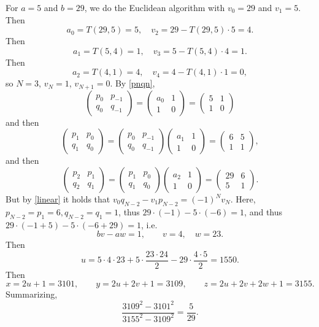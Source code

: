 \documentclass{article}
\begin{document}
 For $a=5$ and $b=29$, we do the Euclidean algorithm with
$v_0=29$ and $v_1=5$. 
Then 
\[
a_0 = T(29,5) = 5,\quad v_2 = 29 - T(29,5)\cdot 5 = 4.
\]
Then 
\[
a_1 = T(5,4) = 1,\quad v_3 = 5 - T(5,4)\cdot 4 = 1.
\]
Then
\[
a_2 = T(4,1) = 4,\quad v_4 = 4 - T(4,1) \cdot 1 = 0,
\]
so $N=3$, $v_N=1$, $v_{N+1}=0$.
By \eqref{pnqn},
\[
\begin{pmatrix}p_0&p_{-1}\\
q_0&q_{-1}
\end{pmatrix}
=\begin{pmatrix}a_0&1\\
1&0
\end{pmatrix}
=\begin{pmatrix}5&1\\
1&0
\end{pmatrix}
\]
and then
\[
\begin{pmatrix}p_1&p_0\\
q_1&q_0
\end{pmatrix}
=\begin{pmatrix}p_0&p_{-1}\\
q_0&q_{-1}
\end{pmatrix}
\begin{pmatrix}a_1&1\\
1&0
\end{pmatrix}
=\begin{pmatrix}
6&5\\
1&1
\end{pmatrix},
\]
and then 
\[
\begin{pmatrix}p_2&p_1\\
q_2&q_1
\end{pmatrix}
=\begin{pmatrix}
p_1&p_0\\
q_1&q_0
\end{pmatrix}
\begin{pmatrix}
a_2&1\\
1&0
\end{pmatrix}
=\begin{pmatrix}
29&6\\
5&1
\end{pmatrix}.
\]
But by
 \eqref{linear} it holds that $v_0 q_{N-2} - v_1 p_{N-2} = (-1)^N v_N$. Here, $p_{N-2}=p_1 = 6, q_{N-2}=q_1=1$, thus
$29\cdot (-1)-5\cdot (-6) = 1$,
and thus
$29 \cdot (-1+5) - 5 \cdot (-6+29)=1$, i.e.
\[
bv-aw=1,\qquad v=4, \quad w=23.
\]
Then
\[
u = 5\cdot 4\cdot 23 + 5\cdot \frac{23\cdot 24}{2} - 29 \cdot \frac{4\cdot 5}{2}
=1550.
\]
Then
\[
x = 2u+1 = 3101,\qquad y = 2u+2v+1 = 3109,\qquad z=2u+2v+2w+1=3155.
\]
Summarizing,
\[
\frac{3109^2 - 3101^2}{3155^2-3109^2} = \frac{5}{29}.
\]
\end{document}
